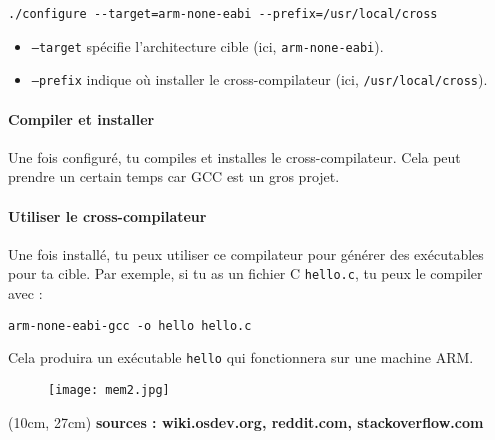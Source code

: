 \documentclass{article}
\begin{document}
\begin{lstlisting}
./configure --target=arm-none-eabi --prefix=/usr/local/cross
\end{lstlisting}

\begin{itemize}
    \item \texttt{--target} spécifie l'architecture cible (ici, \texttt{arm-none-eabi}).
    \item \texttt{--prefix} indique où installer le cross-compilateur (ici, \texttt{/usr/local/cross}).
\end{itemize}

\paragraph{Compiler et installer\\}
Une fois configuré, tu compiles et installes le cross-compilateur. Cela peut prendre un certain temps car GCC est un gros projet.

\paragraph{Utiliser le cross-compilateur\\}
Une fois installé, tu peux utiliser ce compilateur pour générer des exécutables pour ta cible. Par exemple, si tu as un fichier C \texttt{hello.c}, tu peux le compiler avec :

\begin{lstlisting}
arm-none-eabi-gcc -o hello hello.c
\end{lstlisting}

Cela produira un exécutable \texttt{hello} qui fonctionnera sur une machine ARM.\\
\begin{figure}[h!] %
    \centering %
    \texttt{[image: mem2.jpg]} %
    \label{fig:logo2} %
\end{figure}



\begin{textblock*}{10cm}(10cm, 27cm) %
    \textbf{sources : wiki.osdev.org, reddit.com, stackoverflow.com}
\end{textblock*}
\end{document}
